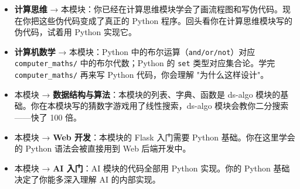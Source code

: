 \documentclass[a4paper,12pt]{ctexart}
\begin{document}
\begin{itemize}
  \item \textbf{计算思维} → 本模块：你已经在计算思维模块学会了画流程图和写伪代码。现在你把这些伪代码变成了真正的 Python 程序。回头看你在计算思维模块写的伪代码，试着用 Python 实现它。
  \item \textbf{计算机数学} → 本模块：Python 中的布尔运算（\texttt{and/or/not}）对应 \texttt{computer\_maths/} 中的布尔代数；Python 的 \texttt{set} 类型对应集合论。学完 \texttt{computer\_maths/} 再来写 Python 代码，你会理解 "为什么这样设计"。
  \item 本模块 → \textbf{数据结构与算法}：本模块的列表、字典、函数是 ds-algo 模块的基础。你在本模块写的猜数字游戏用了线性搜索，ds-algo 模块会教你二分搜索——快了 100 倍。
  \item 本模块 → \textbf{Web 开发}：本模块的 Flask 入门需要 Python 基础。你在这里学会的 Python 语法会被直接用到 Web 后端开发中。
  \item 本模块 → \textbf{AI 入门}：AI 模块的代码全部用 Python 实现。你的 Python 基础决定了你能多深入理解 AI 的内部实现。
\end{itemize}
\end{document}
